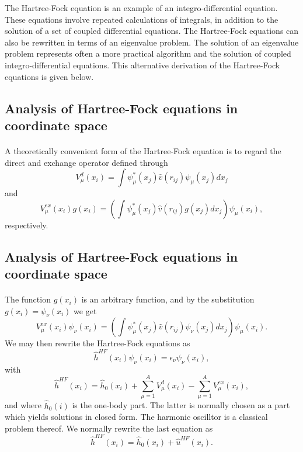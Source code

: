 \documentclass[%
twoside,                 %
final,                   %
10pt]{article}
\begin{document}
The Hartree-Fock equation is an example of an integro-differential equation. These equations involve repeated calculations of integrals, in addition to the solution of a set of coupled differential equations. 
The Hartree-Fock equations can also be rewritten in terms of an eigenvalue problem. The solution of an eigenvalue problem represents often a more practical algorithm and the  solution of  coupled  integro-differential equations.
This alternative derivation of the Hartree-Fock equations is given below.




\subsection*{Analysis of Hartree-Fock equations in coordinate space}

\paragraph{}
  A theoretically convenient form of the
Hartree-Fock equation is to regard the direct and exchange operator
defined through 
\begin{equation*}
  V_{\mu}^{d}(x_i) = \int \psi_{\mu}^*(x_j) 
 \hat{v}(r_{ij})\psi_{\mu}(x_j) dx_j
\end{equation*}
and
\begin{equation*}
  V_{\mu}^{ex}(x_i) g(x_i) 
  = \left(\int \psi_{\mu}^*(x_j) 
 \hat{v}(r_{ij})g(x_j) dx_j
  \right)\psi_{\mu}(x_i),
\end{equation*}
respectively.



\subsection*{Analysis of Hartree-Fock equations in coordinate space}

\paragraph{}
The function $g(x_i)$ is an arbitrary function,
and by the substitution $g(x_i) = \psi_{\nu}(x_i)$
we get
\begin{equation*}
  V_{\mu}^{ex}(x_i) \psi_{\nu}(x_i) 
  = \left(\int \psi_{\mu}^*(x_j) 
 \hat{v}(r_{ij})\psi_{\nu}(x_j)
  dx_j\right)\psi_{\mu}(x_i).
\end{equation*}
We may then rewrite the Hartree-Fock equations as
\[
  \hat{h}^{HF}(x_i) \psi_{\nu}(x_i) = \epsilon_{\nu}\psi_{\nu}(x_i),
\]
with
\[
  \hat{h}^{HF}(x_i)= \hat{h}_0(x_i) + \sum_{\mu=1}^AV_{\mu}^{d}(x_i) -
  \sum_{\mu=1}^AV_{\mu}^{ex}(x_i),
\]
and where $\hat{h}_0(i)$ is the one-body part. The latter is normally chosen as a part which yields solutions in closed form. The harmonic oscilltor is a classical problem thereof.
We normally rewrite the last equation as
\[
  \hat{h}^{HF}(x_i)= \hat{h}_0(x_i) + \hat{u}^{HF}(x_i). 
\]
\end{document}
